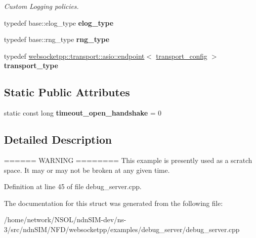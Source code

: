 \begin{DoxyCompactItemize}
\begin{DoxyCompactList}\small\item\em Custom Logging policies. \end{DoxyCompactList}\item 
typedef base\+::elog\+\_\+type {\bfseries elog\+\_\+type}\hypertarget{structdebug__custom_ab0bee0a06071b6a8af852df4adde4b66}{}\label{structdebug__custom_ab0bee0a06071b6a8af852df4adde4b66}

\item 
typedef base\+::rng\+\_\+type {\bfseries rng\+\_\+type}\hypertarget{structdebug__custom_a67265ed1bcec76c010af7c2605786ddf}{}\label{structdebug__custom_a67265ed1bcec76c010af7c2605786ddf}

\item 
typedef \hyperlink{classwebsocketpp_1_1transport_1_1asio_1_1endpoint}{websocketpp\+::transport\+::asio\+::endpoint}$<$ \hyperlink{structdebug__custom_1_1transport__config}{transport\+\_\+config} $>$ {\bfseries transport\+\_\+type}\hypertarget{structdebug__custom_aa4bb700a5ed29f8b2a274b900b72dc67}{}\label{structdebug__custom_aa4bb700a5ed29f8b2a274b900b72dc67}

\end{DoxyCompactItemize}
\subsection*{Static Public Attributes}
\begin{DoxyCompactItemize}
\item 
static const long {\bfseries timeout\+\_\+open\+\_\+handshake} = 0\hypertarget{structdebug__custom_a059d642975e6a25ffa4b43883543461f}{}\label{structdebug__custom_a059d642975e6a25ffa4b43883543461f}

\end{DoxyCompactItemize}


\subsection{Detailed Description}
====== W\+A\+R\+N\+I\+NG ======== This example is presently used as a scratch space. It may or may not be broken at any given time. 

Definition at line 45 of file debug\+\_\+server.\+cpp.



The documentation for this struct was generated from the following file\+:\begin{DoxyCompactItemize}
\item 
/home/network/\+N\+S\+O\+L/ndn\+S\+I\+M-\/dev/ns-\/3/src/ndn\+S\+I\+M/\+N\+F\+D/websocketpp/examples/debug\+\_\+server/debug\+\_\+server.\+cpp\end{DoxyCompactItemize}
